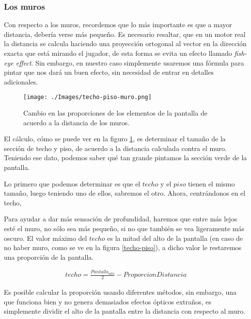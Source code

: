 \subsubsection{Los muros}

Con respecto a los muros, recordemos que lo más importante es que a mayor distancia, debería verse más pequeño. Es necesario resaltar, que en un motor real la distancia se calcula haciendo una proyección ortogonal al vector en la dirección exacta que está mirando el jugador, de esta forma se evita un efecto llamado \emph{fish-eye effect}. Sin embargo, en nuestro caso simplemente usaremos una fórmula para pintar que nos dará un buen efecto, sin necesidad de entrar en detalles adicionales.

\begin{figure}[h!]
	\centering
	\texttt{[image: ./Images/techo-piso-muro.png]}
	\caption{Cambio en las proporciones de los elementos de la pantalla de acuerdo a la distancia de los muros.}
	\label{techo-piso-muro}
\end{figure}

El cálculo, cómo se puede ver en la figuro \ref{techo-piso-muro}, es determinar el tamaño de la sección de techo y piso, de acuerdo a la distancia calculada contra el muro. Teniendo ese dato, podemos saber qué tan grande pintamos la sección verde de la pantalla.

Lo primero que podemos determinar es que el $techo$ y el $piso$ tienen el mismo tamaño, luego teniendo uno de ellos, sabremos el otro. Ahora, centrándonos en el techo, 


Para ayudar a dar más sensación de profundidad, haremos que entre más lejos esté el muro, no sólo sea más pequeño, si no que también se vea ligeramente más oscuro. El valor máximo del $techo$ es la mitad del alto de la pantalla (en caso de no haber muro, como se ve en la figura \ref{techo-piso}), a dicho valor le restaremos una proporción de la pantalla.

\begin{equation}
\begin{aligned}
\label{eq-techo}
techo = \frac{Pantalla_{alto}}{2} - ProporcionDistancia
\end{aligned}
\end{equation}

Es posible calcular la proporción usando diferentes métodos, sin embargo, una que funciona bien y no genera demasiados efectos ópticos extraños, es simplemente dividir el alto de la pantalla entre la distancia con respecto al muro. 

